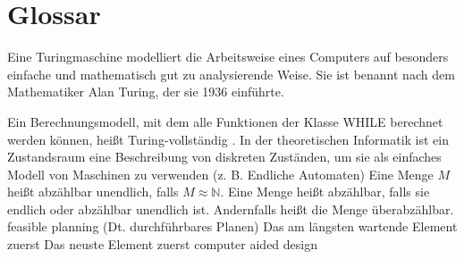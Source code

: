 \chapter{Glossar}

		{Eine Turingmaschine modelliert die Arbeitsweise eines Computers auf besonders einfache und mathematisch gut zu analysierende Weise. Sie ist benannt nach dem Mathematiker Alan Turing, der sie 1936 einführte\cite{wiki:01}.}


			{\grqq Ein Berechnungsmodell, mit dem alle Funktionen
	der Klasse WHILE berechnet werden können, heißt
	Turing-vollständig \cite[Definition 5.4]{Schmitz:19}.\grqq{}}
			{In der theoretischen Informatik ist ein Zustandsraum eine Beschreibung von diskreten Zuständen, um sie als einfaches Modell von Maschinen zu verwenden (z. B. Endliche Automaten)\cite{wiki:02}}
	{Eine Menge $M$ heißt abzählbar unendlich, falls $M \approx \mathbb{N}$. Eine Menge heißt abzählbar, falls sie endlich oder abzählbar unendlich ist. Andernfalls heißt die Menge	überabzählbar\cite[Definititon 5.8]{Schmitz:19}.}
 {feasible planning (Dt. durchführbares Planen)}
 {Das am längsten wartende Element zuerst}
 {Das neuste Element zuerst}
 {computer aided design}
